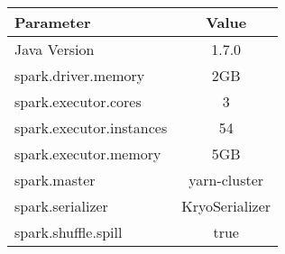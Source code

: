 %
%
%
\begin{table} [h]
\centering
\begin{tabular}{|l|c|}
\hline 
Parameter & Value  \\ 
\hline 
Java Version & 1.7.0 \\ 
\hline 
spark.driver.memory & 2GB \\ 
\hline 
spark.executor.cores & 3  \\ 
\hline 
spark.executor.instances & 54 \\ 
\hline 
spark.executor.memory & 5GB \\ 
\hline 
spark.master & yarn-cluster \\
\hline 
spark.serializer & KryoSerializer \\ 
\hline 
spark.shuffle.spill & true \\ 
\hline 
\end{tabular} 
\end{table}

